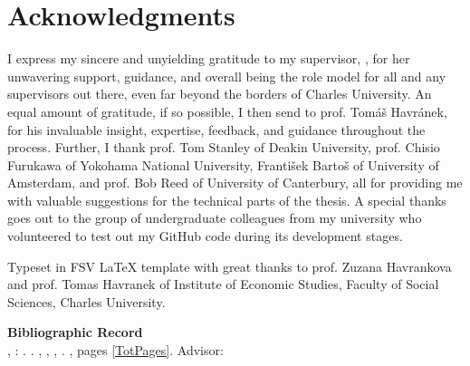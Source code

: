 \section*{Acknowledgments}

I express my sincere and unyielding gratitude to my supervisor, \Supervisor, for her unwavering support, guidance, and overall being the role model for all and any supervisors out there, even far beyond the borders of Charles University. An equal amount of gratitude, if so possible, I then send to prof. Tom\'{a}\v{s} Havr\'{a}nek, for his invaluable insight, expertise, feedback, and guidance throughout the process. Further, I thank prof. Tom Stanley of Deakin University, prof. Chisio Furukawa of Yokohama National University, Franti\v{s}ek Barto\v{s} of University of Amsterdam, and prof. Bob Reed of University of Canterbury, all for providing me with valuable suggestions for the technical parts of the thesis. A special thanks goes out to the group of undergraduate colleagues from my university who volunteered to test out my GitHub code during its development stages.


\vfill

\noindent Typeset in FSV \LaTeX \hspace{0cm} template with great thanks to prof. Zuzana Havrankova and prof. Tomas Havranek of Institute of Economic Studies, Faculty of Social Sciences, Charles University.

\bigskip

\noindent \textbf{Bibliographic Record} \\
\LastNameDP, \FirstNameDP: \emph{\Bookname}. \BookName. \CUNI, \FSS, \IES, \Place. \Year, pages \ref*{TotPages}. Advisor: \Supervisor


